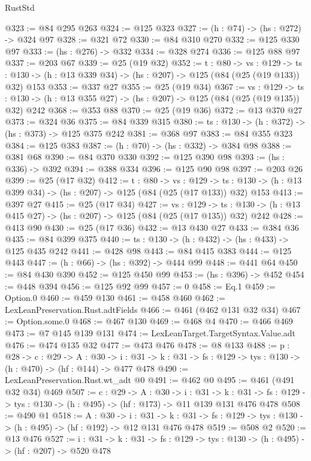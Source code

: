 \begin{lexlean}{RustStd}
\begin{coremodule}
{\begin{coremodule}
{{{{{{{{{{{{{{{@323 := @84 @295 @263
@324 := @125 @323
@327 := (h : @74) -> (hs : @272) -> @324 @97
@328 := @321 @72
@330 := @84 @310 @270
@332 := @125 @330 @97
@333 := (hs : @276) -> @332
@334 := @328 @274
@336 := @125 @88 @97
@337 := @203 @67
@339 := @25 (@19 @32)
@352 := {t : @80} ->
  {vs : @129} ->
  {ts : @130} -> (h : @13 @339 @34) -> (hs : @207) -> @125 (@84 (@25 (@19 @133)) @32) @153
@353 := @337 @27
@355 := @25 (@19 @34)
@367 := {vs : @129} ->
  {ts : @130} -> (h : @13 @355 @27) -> (hs : @207) -> @125 (@84 (@25 (@19 @135)) @32) @242
@368 := @353 @88
@370 := @25 (@19 @36)
@372 := @13 @370 @27
@373 := @324 @36
@375 := @84 @339 @315
@380 := {ts : @130} -> (h : @372) -> (hs : @373) -> @125 @375 @242
@381 := @368 @97
@383 := @84 @355 @323
@384 := @125 @383
@387 := (h : @70) -> (hs : @332) -> @384 @98
@388 := @381 @68
@390 := @84 @370 @330
@392 := @125 @390 @98
@393 := (hs : @336) -> @392
@394 := @388 @334
@396 := @125 @90 @98
@397 := @203 @26
@399 := @25 (@17 @32)
@412 := {t : @80} ->
  {vs : @129} ->
  {ts : @130} -> (h : @13 @399 @34) -> (hs : @207) -> @125 (@84 (@25 (@17 @133)) @32) @153
@413 := @397 @27
@415 := @25 (@17 @34)
@427 := {vs : @129} ->
  {ts : @130} -> (h : @13 @415 @27) -> (hs : @207) -> @125 (@84 (@25 (@17 @135)) @32) @242
@428 := @413 @90
@430 := @25 (@17 @36)
@432 := @13 @430 @27
@433 := @384 @36
@435 := @84 @399 @375
@440 := {ts : @130} -> (h : @432) -> (hs : @433) -> @125 @435 @242
@441 := @428 @98
@443 := @84 @415 @383
@444 := @125 @443
@447 := (h : @66) -> (hs : @392) -> @444 @99
@448 := @441 @64
@450 := @84 @430 @390
@452 := @125 @450 @99
@453 := (hs : @396) -> @452
@454 := @448 @394
@456 := @125 @92 @99
@457 := 0
@458 := Eq.{1}
@459 := Option.{0}
@460 := @459 @130
@461 := @458 @460
@462 := LexLeanPreservation.Rust.adtFields
@466 := @461 (@462 @131 @32 @34)
@467 := Option.some.{0}
@468 := @467 @130
@469 := @468 @4
@470 := @466 @469
@473 := @7 @145 @139 @131
@474 := LexLeanTarget.TargetSyntax.Value.adt
@476 := @474 @135 @32
@477 := @473 @476
@478 := @8 @133
@488 := {p : @28} ->
  {c : @29} ->
  {A : @30} ->
  {i : @31} -> {k : @31} -> {fs : @129} -> {tys : @130} -> (h : @470) -> (hf : @144) -> @477 @478
@490 := LexLeanPreservation.Rust.wt_adt @0
@491 := @462 @0
@495 := @461 (@491 @32 @34) @469
@507 := {c : @29} ->
  {A : @30} ->
  {i : @31} ->
  {k : @31} -> {fs : @129} -> {tys : @130} -> (h : @495) -> (hf : @173) -> @11 @139 @131 @476 @478
@508 := @490 @1
@518 := {A : @30} ->
  {i : @31} ->
  {k : @31} -> {fs : @129} -> {tys : @130} -> (h : @495) -> (hf : @192) -> @12 @131 @476 @478
@519 := @508 @2
@520 := @13 @476
@527 := {i : @31} ->
  {k : @31} -> {fs : @129} -> {tys : @130} -> (h : @495) -> (hf : @207) -> @520 @478
}}}}}}}}}}}}}}}
\end{coremodule}}
\end{coremodule}
\end{lexlean}
